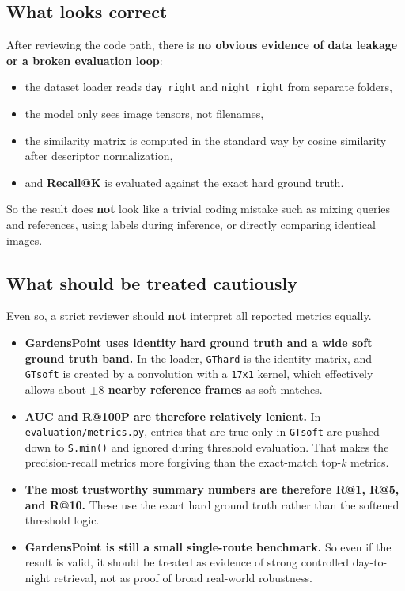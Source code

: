 \documentclass[11pt]{article}
\begin{document}
\subsection*{What looks correct}
After reviewing the code path, there is \textbf{no obvious evidence of data leakage or a broken evaluation loop}:
\begin{itemize}[leftmargin=*]
  \item the dataset loader reads \texttt{day\_right} and \texttt{night\_right} from separate folders,
  \item the model only sees image tensors, not filenames,
  \item the similarity matrix is computed in the standard way by cosine similarity after descriptor normalization,
  \item and \textbf{Recall@K} is evaluated against the exact hard ground truth.
\end{itemize}

So the result does \textbf{not} look like a trivial coding mistake such as mixing queries and references, using labels during inference, or directly comparing identical images.

\subsection*{What should be treated cautiously}
Even so, a strict reviewer should \textbf{not} interpret all reported metrics equally.

\begin{itemize}[leftmargin=*]
  \item \textbf{GardensPoint uses identity hard ground truth and a wide soft ground truth band.} In the loader, \texttt{GThard} is the identity matrix, and \texttt{GTsoft} is created by a convolution with a \texttt{17x1} kernel, which effectively allows about \textbf{$\pm 8$ nearby reference frames} as soft matches.
  \item \textbf{AUC and R@100P are therefore relatively lenient.} In \texttt{evaluation/metrics.py}, entries that are true only in \texttt{GTsoft} are pushed down to \texttt{S.min()} and ignored during threshold evaluation. That makes the precision-recall metrics more forgiving than the exact-match top-$k$ metrics.
  \item \textbf{The most trustworthy summary numbers are therefore R@1, R@5, and R@10.} These use the exact hard ground truth rather than the softened threshold logic.
  \item \textbf{GardensPoint is still a small single-route benchmark.} So even if the result is valid, it should be treated as evidence of strong controlled day-to-night retrieval, not as proof of broad real-world robustness.
\end{itemize}
\end{document}
